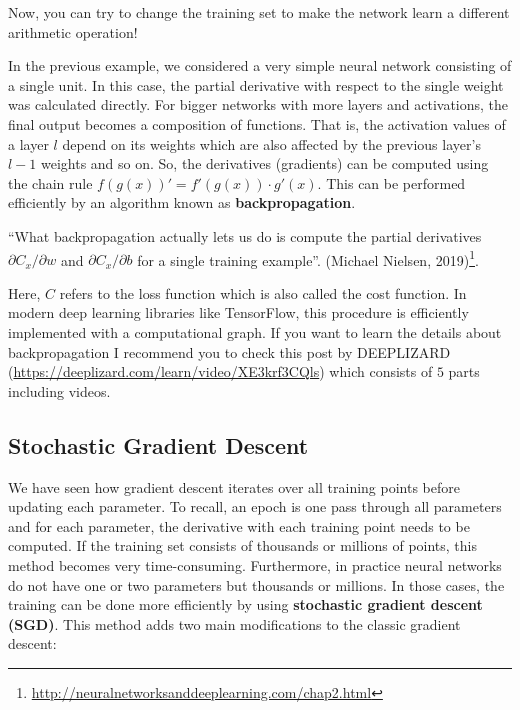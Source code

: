 \documentclass[
  11pt,
]{krantz}
\renewenvironment{quote}{\begin{VF}}{\end{VF}}
\begin{document}
Now, you can try to change the training set to make the network learn a different arithmetic operation!

In the previous example, we considered a very simple neural network consisting of a single unit. In this case, the partial derivative with respect to the single weight was calculated directly. For bigger networks with more layers and activations, the final output becomes a composition of functions. That is, the activation values of a layer \(l\) depend on its weights which are also affected by the previous layer's \(l-1\) weights and so on. So, the derivatives (gradients) can be computed using the chain rule \(f(g(x))' = f'(g(x)) \cdot g'(x)\). This can be performed efficiently by an algorithm known as \textbf{backpropagation}.

\begin{quote}
``What backpropagation actually lets us do is compute the partial derivatives \(\partial C_x / \partial w\) and \(\partial C_x / \partial b\) for a single training example''. (Michael Nielsen, 2019)\footnote{\url{http://neuralnetworksanddeeplearning.com/chap2.html}}.
\end{quote}

Here, \(C\) refers to the loss function which is also called the cost function. In modern deep learning libraries like TensorFlow, this procedure is efficiently implemented with a computational graph. If you want to learn the details about backpropagation I recommend you to check this post by DEEPLIZARD (\url{https://deeplizard.com/learn/video/XE3krf3CQls}) which consists of \(5\) parts including videos.

\hypertarget{stochastic-gradient-descent}{%
\subsection{Stochastic Gradient Descent}\label{stochastic-gradient-descent}}

We have seen how gradient descent iterates over all training points before updating each parameter. To recall, an epoch is one pass through all parameters and for each parameter, the derivative with each training point needs to be computed. If the training set consists of thousands or millions of points, this method becomes very time-consuming. Furthermore, in practice neural networks do not have one or two parameters but thousands or millions. In those cases, the training can be done more efficiently by using \textbf{stochastic gradient descent (SGD)}. This method adds two main modifications to the classic gradient descent:
\end{document}
